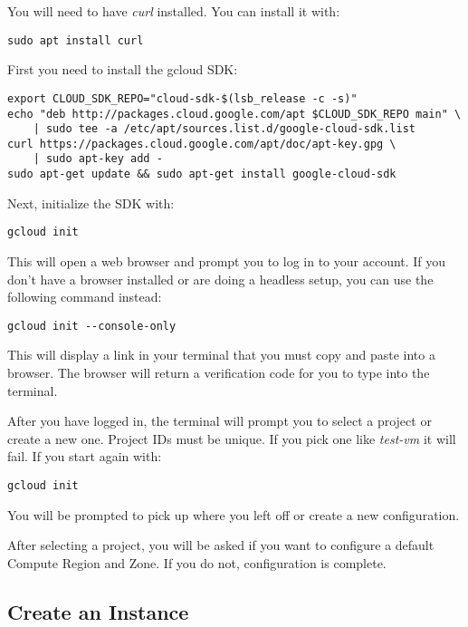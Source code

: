 You will need to have \emph{curl} installed. You can install it with:

\begin{lstlisting}
sudo apt install curl
\end{lstlisting}

First you need to install the gcloud SDK:

\begin{lstlisting}
export CLOUD_SDK_REPO="cloud-sdk-$(lsb_release -c -s)" 
echo "deb http://packages.cloud.google.com/apt $CLOUD_SDK_REPO main" \
    | sudo tee -a /etc/apt/sources.list.d/google-cloud-sdk.list 
curl https://packages.cloud.google.com/apt/doc/apt-key.gpg \
    | sudo apt-key add - 
sudo apt-get update && sudo apt-get install google-cloud-sdk 
\end{lstlisting}

Next, initialize the SDK with:

\begin{lstlisting}
gcloud init 
\end{lstlisting}

This will open a web browser and prompt you to log in to your account.
If you don't have a browser installed or are doing a headless setup, you
can use the following command instead:

\begin{lstlisting}
gcloud init --console-only 
\end{lstlisting}

This will display a link in your terminal that you must copy and paste
into a browser. The browser will return a verification code for you to
type into the terminal.

After you have logged in, the terminal will prompt you to select a
project or create a new one. Project IDs must be unique. If you pick one
like \emph{test-vm} it will fail. If you start again with:

\begin{lstlisting}
gcloud init 
\end{lstlisting}

You will be prompted to pick up where you left off or create a new
configuration.

After selecting a project, you will be asked if you want to configure a
default Compute Region and Zone. If you do not, configuration is
complete.

\subsection{Create an Instance}

